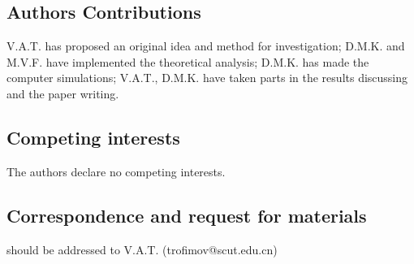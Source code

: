 \documentclass[a4paper, 12pt, onecolumn]{extarticle}
\begin{document}
\subsection*{Authors Contributions}
V.A.T. has proposed an original idea and method for investigation; D.M.K. and M.V.F. have implemented the theoretical analysis; D.M.K. has made the computer simulations; V.A.T., D.M.K. have taken parts in the results discussing and the paper writing.

\subsection*{Competing interests}
The authors declare no competing interests.

\subsection*{Correspondence and request for materials}
should be addressed to V.A.T. (trofimov@scut.edu.cn)





\end{document}
